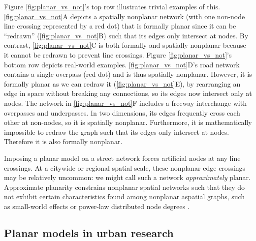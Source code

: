 \documentclass[Afour,sageh,times]{sagej}
\begin{document}
Figure \ref{fig:planar_vs_not}'s top row illustrates trivial examples of this. \ref{fig:planar_vs_not}A depicts a spatially nonplanar network (with one non-node line crossing represented by a red dot) that is formally planar since it can be \enquote{redrawn} (\ref{fig:planar_vs_not}B) such that its edges only intersect at nodes. By contrast, \ref{fig:planar_vs_not}C is both formally and spatially nonplanar because it cannot be redrawn to prevent line crossings. Figure \ref{fig:planar_vs_not}'s bottom row depicts real-world examples. \ref{fig:planar_vs_not}D's road network contains a single overpass (red dot) and is thus spatially nonplanar. However, it is formally planar as we can redraw it (\ref{fig:planar_vs_not}E), by rearranging an edge in space without breaking any connections, so its edges now intersect only at nodes. The network in \ref{fig:planar_vs_not}F includes a freeway interchange with overpasses and underpasses. In two dimensions, its edges frequently cross each other at non-nodes, so it is spatially nonplanar. Furthermore, it is mathematically impossible to redraw the graph such that its edges only intersect at nodes. Therefore it is also formally nonplanar.

Imposing a planar model on a street network forces artificial nodes at any line crossings. At a citywide or regional spatial scale, these nonplanar edge crossings may be relatively uncommon: we might call such a network \emph{approximately} planar. Approximate planarity constrains nonplanar spatial networks such that they do not exhibit certain characteristics found among nonplanar aspatial graphs, such as small-world effects or power-law distributed node degrees \citep{crucitti_centrality_2006,fischer_spatial_2014}.

\subsection{Planar models in urban research}
\end{document}
